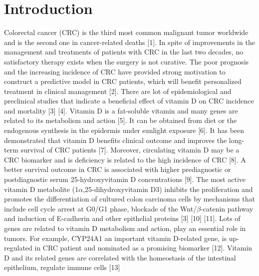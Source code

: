 \documentclass[fleqn,10pt]{SelfArx} %
\affiliation{\textsuperscript{1}\textit{diego.barqueromorera@studenti.unitn.it}} %
\affiliation{\textsuperscript{2}\textit{giacomo.fantoni@studenti.unitn.it}} %
\affiliation{\textsuperscript{3}\textit{gaia.faggin@studenti.unitn.it}} %
\affiliation{\textsuperscript{4}\textit{leonardo.golinelli@studenti.unitn.it}} %
\begin{document}
\maketitle %

\tableofcontents %

\thispagestyle{empty} %


\section*{Introduction} %


Colorectal cancer (CRC) is the third most common malignant tumor worldwide and is the second one in cancer-related deaths [1]. In spite of improvements in the management and treatments of patients with CRC in the last two decades, no satisfactory therapy exists when the surgery is not curative. The poor prognosis and the increasing incidence of CRC have provided strong motivation to construct a predictive model in CRC patients, which will benefit personalized treatment in clinical management [2].
There are lot of epidemiological and preclinical studies that indicate a beneficial effect of vitamin D on CRC incidence and mortality [3] [4].
Vitamin D is a fat-soluble vitamin and many genes are related to its metabolism and action [5]. It can be obtained from diet or the endogenous synthesis in the epidermis under sunlight exposure [6]. It has been demonstrated that vitamin D benefits clinical outcome and improves the long-term survival of CRC patients [7]. Moreover, circulating vitamin D may be a CRC biomarker and is deficiency is related to the high incidence of CRC [8].
A better survival outcome in CRC is associated with higher prediagnostic or postdiagnostic serum 25-hydroxyvitamin D concentrations [9]. The most active vitamin D metabolite (1$\alpha$,25-dihydroxyvitamin D3) inhibits the proliferation and promotes the differentiation of cultured colon carcinoma cells by mechanisms that include cell cycle arrest at G0/G1 phase, blockade of the Wnt/$\beta$-catenin pathway and induction of E-cadherin and other epithelial proteins [3] [10] [11].
Lots of genes are related to vitamin D metabolism and action, play an essential role in tumors. For example, CYP24A1 an important vitamin D-related gene, is up-regulated in CRC patient and nominated as a promising biomarker [12]. Vitamin D and its related genes are correlated with the homeostasis of the intestinal epithelium, regulate immune cells [13]
\end{document}
